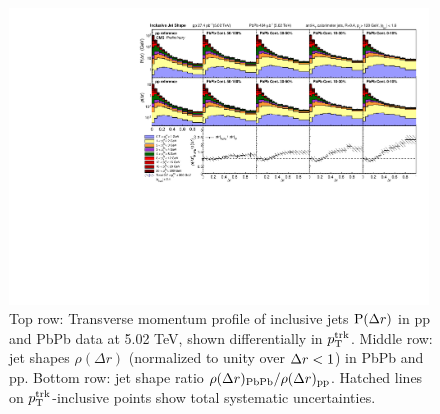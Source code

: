   \begin{figure}[hbt]
    \begin{center}
       \includegraphics[width=0.99\textwidth]{figures/results/JetShapes_WithHighpT_pTweighted_3Row.pdf}
         \caption[Inclusive jet shape at 5.02 TeV, shown differentially in $p_{\rm T}^{\rm trk}$]{Top row: Transverse momentum profile of inclusive jets ${\rm P}(\Delta r)$ in pp and PbPb data at 5.02 TeV, shown differentially in $p_{\rm T}^{\rm trk}$.  Middle row: jet shapes $\rho(\Delta r)$ (normalized to unity over $\protect\Delta r < 1$) in PbPb and pp. Bottom row:  jet shape ratio $\rho(\Delta r)_{\rm PbPb} / \rho(\Delta r)_{\rm pp}$. Hatched lines on $p_{\rm T}^{\rm trk}$-inclusive points show total systematic uncertainties.}
       \label{fig:jetshape_dr_stacked}
    \end{center}
 \end{figure}


